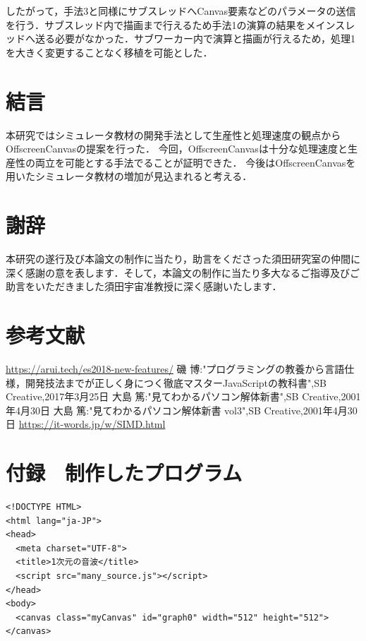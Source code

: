 \documentclass[a4j,12pt]{jsarticle}
\begin{document}
{したがって，手法3と同様にサブスレッドへCanvas要素などのパラメータの送信を行う．サブスレッド内で描画まで行えるため手法1の演算の結果をメインスレッドへ送る必要がなかった．サブワーカー内で演算と描画が行えるため，処理1を大きく変更することなく移植を可能とした．
\newpage


\section{結言}
本研究ではシミュレータ教材の開発手法として生産性と処理速度の観点からOffscreenCanvasの提案を行った．
今回，OffscreenCanvasは十分な処理速度と生産性の両立を可能とする手法でることが証明できた．
今後はOffscreenCanvasを用いたシミュレータ教材の増加が見込まれると考える．
\newpage

\section{謝辞}
本研究の遂行及び本論文の制作に当たり，助言をくださった須田研究室の仲間に深く感謝の意を表します．そして，本論文の制作に当たり多大なるご指導及びご助言をいただきました須田宇宙准教授に深く感謝いたします．
\newpage

\section{参考文献}
\begin{thebibliography}{99}
\url{https://arui.tech/es2018-new-features/}
磯 博:"プログラミングの教養から言語仕様，開発技法までが正しく身につく徹底マスターJavaScriptの教科書",SB Creative,2017年3月25日
大島 篤:"見てわかるパソコン解体新書",SB Creative,2001年4月30日
大島 篤:"見てわかるパソコン解体新書 vol3",SB Creative,2001年4月30日
\url{https://it-words.jp/w/SIMD.html}
\end{thebibliography}
\newpage

\setcounter{page}{1} 
\section{付録　制作したプログラム}

\lstset{
    numbers=left,
    tabsize=2
}
\begin{lstlisting}
<!DOCTYPE HTML>
<html lang="ja-JP">
<head>
  <meta charset="UTF-8">
  <title>1次元の音波</title>
  <script src="many_source.js"></script>
</head>
<body>
  <canvas class="myCanvas" id="graph0" width="512" height="512"></canvas>


\end{lstlisting}}
\end{document}
